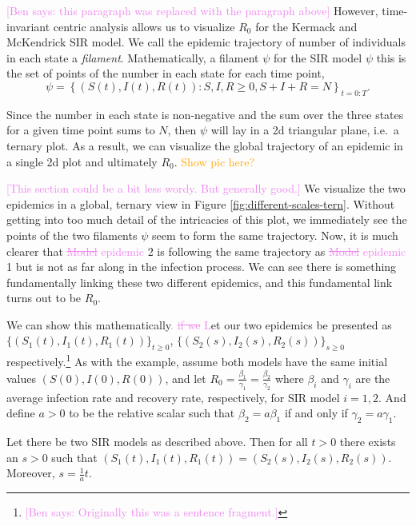 \documentclass[
  shortnames]{jss}
\begin{document}
\textcolor{violet}{[Ben says: this paragraph was replaced with the paragraph above]}
However, time-invariant centric analysis allows us to visualize \(R_0\)
for the Kermack and McKendrick SIR model. We call the epidemic
trajectory of number of individuals in each state a \textit{filament}.
Mathematically, a filament \(\psi\) for the SIR model \(\psi\) this is
the set of points of the number in each state for each time point, \[
\psi = \left \{(S(t), I(t), R(t)): S, I, R \ge 0, S + I + R = N \right \}_{t=0:T}.
\]

Since the number in each state is non-negative and the sum over the
three states for a given time point sums to \(N\), then \(\psi\) will
lay in a 2d triangular plane, i.e.~a ternary plot. As a result, we can
visualize the global trajectory of an epidemic in a single 2d plot and
ultimately \(R_0\). \textcolor{orange}{Show pic here?}

\textcolor{violet}{[This section could be a bit less wordy. But generally good.]}
We visualize the two epidemics in a global, ternary view in Figure
\ref{fig:different-scales-tern}. Without getting into too much detail of
the intricacies of this plot, we immediately see the points of the two
filaments \(\psi\) seem to form the same trajectory. Now, it is much
clearer that \textcolor{violet}{\sout{Model} epidemic} 2 is following
the same trajectory as \textcolor{violet}{\sout{Model} epidemic} 1 but
is not as far along in the infection process. We can see there is
something fundamentally linking these two different epidemics, and this
fundamental link turns out to be \(R_0\).

We can show this mathematically\textcolor{violet}{.\sout{ if we} L}et
our two epidemics be presented as
\(\{(S_1(t), I_1(t), R_1(t))\}_{t\geq0}\),
\(\{(S_2(s), I_2(s), R_2(s))\}_{s \geq 0}\)
respectively.\footnote{\textcolor{violet}{[Ben says: Originally this was a sentence fragment.]}}
As with the example, assume both models have the same initial values
\((S(0), I(0), R(0))\), and let
\(R_0 =\frac{\beta_1}{\gamma_1} = \frac{\beta_2}{\gamma_2}\) where
\(\beta_i\) and \(\gamma_i\) are the average infection rate and recovery
rate, respectively, for SIR model \(i=1, 2\). And define \(a>0\) to be
the relative scalar such that \(\beta_2 = a \beta_1\) if and only if
\(\gamma_2 = a \gamma_1\).

\begin{theorem}\label{thm:sir-scale}
Let there be two SIR models as described above.  Then for all $t > 0$ there exists an $s>0$ such that $(S_1(t), I_1(t), R_1(t)) = (S_2(s), I_2(s), R_2(s))$.  Moreover, $s = \frac{1}{a}t$.
\end{theorem}
\end{document}
